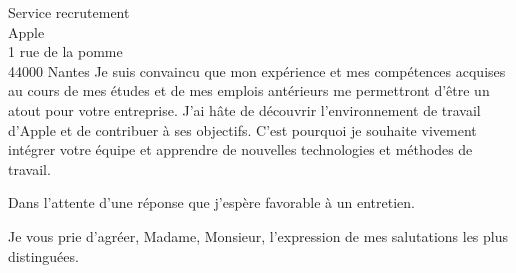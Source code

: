\documentclass[
    french,
    sender,
    paper=a4,
    version=last,
    fontsize=9pt,
    DIV=12,
    BCOR=0mm
]{scrlttr2}
\begin{document}
\begin{letter}{
    Service recrutement\\
    Apple\\
    1 rue de la pomme\\
    44000 Nantes
}
Je suis convaincu que mon expérience et mes compétences acquises au cours de mes études et de mes emplois antérieurs me permettront d'être un atout pour votre entreprise. J'ai hâte de découvrir l'environnement de travail d'Apple et de contribuer à ses objectifs. C'est pourquoi je souhaite vivement intégrer votre équipe et apprendre de nouvelles technologies et méthodes de travail.

Dans l’attente d’une réponse que j'espère favorable à un entretien.

\closing{Je vous prie d’agréer, Madame, Monsieur, l’expression de mes salutations les plus distinguées.\\}

\end{letter}
\end{document}

